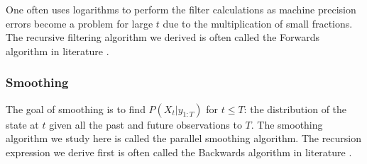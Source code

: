 \documentclass[../masters.tex]{subfiles}
\begin{document}
One often uses logarithms to perform the filter calculations as machine precision errors become a problem for large $t$ due to the multiplication of small fractions. The recursive filtering algorithm we derived is often called the Forwards algorithm in literature \cite{barber}.

\subsubsection{Smoothing}
The goal of smoothing is to find $P(X_t|y_{1:T})$ for $t\leq T$: the distribution of the state at $t$ given all the past and future observations to $T$. The smoothing algorithm we study here is called the parallel smoothing algorithm. The recursion expression we derive first is often called the Backwards algorithm in literature \cite{murphy1}.
\end{document}
